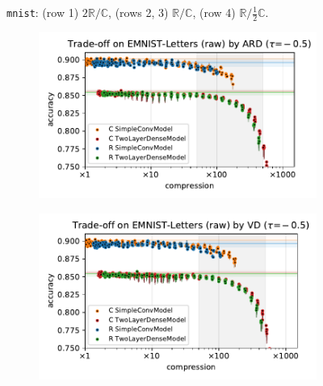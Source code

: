 \documentclass[a4paper,10pt,onecolumn]{article}
\newcommand{\real}{\mathbb{R}}
\newcommand{\cplx}{\mathbb{C}}
\begin{document}
\begin{figure}[b]
\begin{subfigure}[b]{0.5\columnwidth}
  \end{subfigure}
  \caption{%
    \texttt{mnist}: (row 1) $2\real / \cplx$, (rows 2, 3) $\real / \cplx$, (row 4) $\real / \tfrac12\cplx$.
  }
\end{figure}


\begin{figure}[b]
  \centering
  \begin{subfigure}[b]{0.5\columnwidth}
    \centering
    \includegraphics[width=\columnwidth]{figure__mnist-like__trade-off/appendix__ARD__emnist_letters__raw__-0.5.pdf}
  \end{subfigure}%
  \begin{subfigure}[b]{0.5\columnwidth}
    \centering
    \includegraphics[width=\columnwidth]{figure__mnist-like__trade-off/appendix__VD__emnist_letters__raw__-0.5.pdf}
  \end{subfigure} \\ %
  \begin{subfigure}[b]{0.5\columnwidth}

\end{subfigure}
\end{figure}
\end{document}

